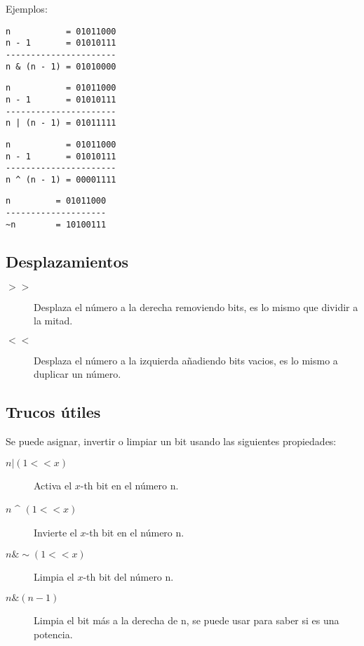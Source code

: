 \documentclass[10pt]{article}
\begin{document}
Ejemplos:

\begin{verbatim}
n           = 01011000
n - 1       = 01010111
----------------------
n & (n - 1) = 01010000
\end{verbatim}

\begin{verbatim}
n           = 01011000
n - 1       = 01010111
----------------------
n | (n - 1) = 01011111
\end{verbatim}

\begin{verbatim}
n           = 01011000
n - 1       = 01010111
----------------------
n ^ (n - 1) = 00001111
\end{verbatim}

\begin{verbatim}
n         = 01011000
--------------------
~n        = 10100111
\end{verbatim}

\subsection{Desplazamientos}

\begin{description}
    \item[$ >> $] Desplaza el número a la derecha removiendo bits, es lo mismo que dividir a la mitad.
    \item[$ << $] Desplaza el número a la izquierda añadiendo bits vacios, es lo mismo a duplicar un número.
\end{description}

\subsection{Trucos útiles}

Se puede asignar, invertir o limpiar un bit usando las siguientes propiedades:

\begin{description}
    \item[$ n | (1 << x) $] Activa el $x$-th bit en el número n.
    \item[$ n $ \^{} $ (1 << x) $] Invierte el $x$-th bit en el número n.
    \item[$ n \& \sim (1 << x) $] Limpia el $x$-th bit del número n.
    \item[$ n \& (n - 1) $] Limpia el bit más a la derecha de n, se puede usar para saber si es una potencia.
\end{description}
\end{document}

